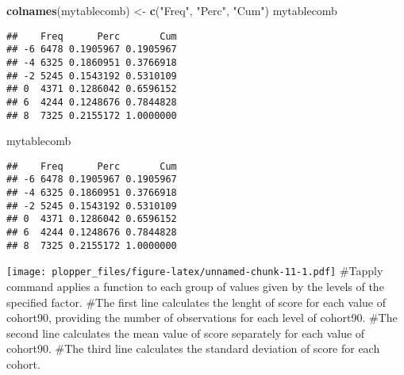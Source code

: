 \documentclass[]{article}
\newenvironment{Shaded}{\begin{snugshade}}{\end{snugshade}}
\newcommand{\KeywordTok}[1]{\textcolor[rgb]{0.13,0.29,0.53}{\textbf{#1}}}
\newcommand{\DataTypeTok}[1]{\textcolor[rgb]{0.13,0.29,0.53}{#1}}
\newcommand{\DecValTok}[1]{\textcolor[rgb]{0.00,0.00,0.81}{#1}}
\newcommand{\StringTok}[1]{\textcolor[rgb]{0.31,0.60,0.02}{#1}}
\newcommand{\OperatorTok}[1]{\textcolor[rgb]{0.81,0.36,0.00}{\textbf{#1}}}
\newcommand{\NormalTok}[1]{#1}
\begin{document}
\begin{Shaded}
\begin{Highlighting}[]
\KeywordTok{colnames}\NormalTok{(mytablecomb) <-}\StringTok{ }\KeywordTok{c}\NormalTok{(}\StringTok{"Freq"}\NormalTok{, }\StringTok{"Perc"}\NormalTok{, }\StringTok{"Cum"}\NormalTok{)}
\NormalTok{mytablecomb}
\end{Highlighting}
\end{Shaded}

\begin{verbatim}
##    Freq      Perc       Cum
## -6 6478 0.1905967 0.1905967
## -4 6325 0.1860951 0.3766918
## -2 5245 0.1543192 0.5310109
## 0  4371 0.1286042 0.6596152
## 6  4244 0.1248676 0.7844828
## 8  7325 0.2155172 1.0000000
\end{verbatim}

\begin{Shaded}
\begin{Highlighting}[]
\NormalTok{mytablecomb}
\end{Highlighting}
\end{Shaded}

\begin{verbatim}
##    Freq      Perc       Cum
## -6 6478 0.1905967 0.1905967
## -4 6325 0.1860951 0.3766918
## -2 5245 0.1543192 0.5310109
## 0  4371 0.1286042 0.6596152
## 6  4244 0.1248676 0.7844828
## 8  7325 0.2155172 1.0000000
\end{verbatim}

\begin{Shaded}
\end{Shaded}

\texttt{[image: plopper\_files/figure-latex/unnamed-chunk-11-1.pdf]}
\#Tapply command applies a function to each group of values given by the
levels of the specified factor. \#The first line calculates the lenght
of score for each value of cohort90, providing the number of
observations for each level of cohort90. \#The second line calculates
the mean value of score separately for each value of cohort90. \#The
third line calculates the standard deviation of score for each cohort.
\end{document}
